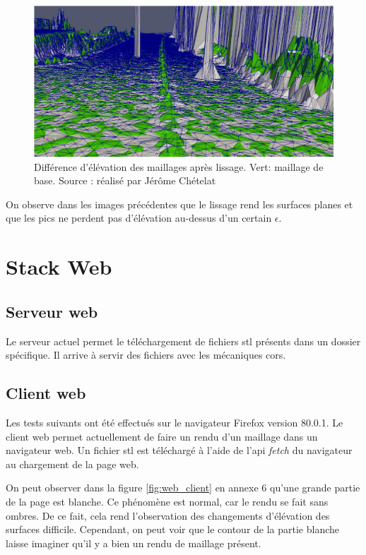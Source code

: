 \begin{figure}[htbp!]
    \centering
    \includegraphics[width=0.8\linewidth]{figures/mesh_noise_difference.png}
    \caption{Différence d'élévation des maillages après lissage. Vert: maillage de base. Source : réalisé par Jérôme Chételat}
    \label{fig:mesh_noise_diff}
\end{figure}

On observe dans les images précédentes que le lissage rend les surfaces planes et que les pics ne perdent pas d'élévation au-dessus d'un certain $\epsilon$.

\section{Stack Web}
\subsection{Serveur web}

Le serveur actuel permet le téléchargement de fichiers \gls{stl} présents dans
un dossier spécifique. Il arrive à servir des fichiers avec les mécaniques \gls{cors}.

\subsection{Client web}
Les tests suivants ont été effectués sur le navigateur Firefox version 80.0.1.
Le client web permet actuellement de faire un rendu d'un maillage dans un
navigateur web. Un fichier \gls{stl} est téléchargé à l'aide de l'api
\textit{fetch} du navigateur au chargement de la page web.

On peut observer dans la figure \ref{fig:web_client} en annexe 6 qu'une grande partie de la page est blanche.
Ce phénomène est normal, car le rendu se fait sans ombres.
De ce fait, cela rend l'observation des changements d'élévation des surfaces difficile.
Cependant, on peut voir que le contour de la partie blanche laisse imaginer qu'il y a bien un rendu de maillage présent.

